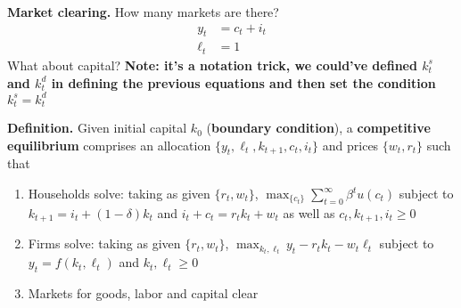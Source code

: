 \documentclass[11pt, aspectratio=169]{beamer}
\begin{document}
\begin{frame}{}

\vspace{4mm}
\textbf{Market clearing.} How many markets are there? 
\begin{align*}
	y_t &= c_t + i_t \\
	\ell_t &= 1 
\end{align*}
What about capital? \textbf{Note: it's a notation trick, we could've defined $k_t^s$ and $k_t^d$ in defining the previous equations and then set the condition $k_t^s=k_t^d$}

\vspace{5mm}
\textbf{Definition.} Given initial capital $k_0$ (\textbf{boundary condition}), a \textbf{competitive equilibrium} comprises an allocation $\{y_t, \ell_t, k_{t+1}, c_t, i_t\}$ and prices $\{w_t, r_t\}$ such that
\begin{enumerate}
	\item Households solve: taking as given $\{r_t, w_t\}$, $\max_{\{c_t\}} \sum_{t = 0}^\infty \beta^t u(c_t)$ subject to $k_{t+1} = i_t + (1 - \delta) k_t$ and $i_t + c_t = r_t k_t + w_t$ as well as $c_t, k_{t+1}, i_t \geq 0$

	\item Firms solve: taking as given $\{r_t, w_t\}$, $\max_{k_t, \ell_t} y_t - r_t k_t - w_t \ell_t$ subject to $y_t = f(k_t, \ell_t)$ and $k_t, \ell_t \geq 0$

	\item Markets for goods, labor and capital clear
\end{enumerate}

\end{frame}
\end{document}
